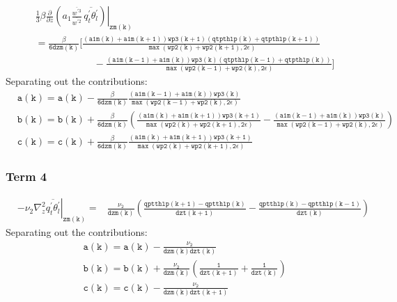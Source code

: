 \documentclass[11pt,fleqn]{article}
\newcommand{\ptlder}[2]{\frac{\partial #1}{\partial #2}}
\begin{document}
\begin{equation}
\begin{split}
& \left.
  \frac{1}{3} \beta
   \ptlder{}{z}
     \left( 
       a_1
       \frac{\overline{w^{'3}}}{\overline{w^{'2}}} \,
       \overline{q_t^{'}\theta_l^{'}}
     \right)
   \right|_{\mathtt{zm(k)}} \\
&= \mathtt{
    \frac{\beta}{6 dzm(k)}
    \bigg[ \frac{\left(a1m(k)+a1m(k+1)\right) wp3(k+1) \left(qtpthlp(k)+qtpthlp(k+1) \right)}
                {\max\left(wp2(k)+wp2(k+1),2\epsilon\right)} } \\
&  \mathtt{ \quad \quad \quad \quad \quad \quad
          -\frac{\left(a1m(k-1)+a1m(k)\right) wp3(k) \left(qtpthlp(k-1)+qtpthlp(k) \right)}
                {\max\left(wp2(k-1)+wp2(k),2\epsilon\right)}
    \bigg]
    }
\end{split}
\end{equation}
%
Separating out the contributions:
%
\begin{equation}
\begin{split}
& \mathtt{ 
   a(k) = a(k) - \frac{\beta}{6 dzm(k)}
                 \frac{\left(a1m(k-1)+a1m(k)\right) wp3(k)}
                      {\max\left(wp2(k-1)+wp2(k),2\epsilon\right)}
  } \\
& \mathtt{
   b(k) = b(k) + \frac{\beta}{6 dzm(k)}
                 \left(
                   \frac{\left(a1m(k)+a1m(k+1)\right) wp3(k+1)}
                        {\max\left(wp2(k)+wp2(k+1),2\epsilon\right)}
                  -\frac{\left(a1m(k-1)+a1m(k)\right) wp3(k)}
                        {\max\left(wp2(k-1)+wp2(k),2\epsilon\right)}
                 \right)
  } \\
& \mathtt{
   c(k) = c(k) + \frac{\beta}{6 dzm(k)}
                 \frac{\left(a1m(k)+a1m(k+1)\right) wp3(k+1)}
                      {\max\left(wp2(k)+wp2(k+1),2\epsilon\right)}
  }
\end{split}
\end{equation}
 
\subsubsection{Term 4}

\begin{equation}
\begin{split}
& \left. - \nu_2 \nabla_z^2 \overline{q_t^{'}\theta_l^{'}} \right|_{\mathtt{zm(k)}}
=& \mathtt{
    \frac{\nu_2}{dzm(k)}
    \left( \frac{qptthlp(k+1)-qptthlp(k)}{dzt(k+1)}
          -\frac{qptthlp(k)-qptthlp(k-1)}{dzt(k)}
    \right)
   }
\end{split}
\end{equation}
%
Separating out the contributions:
%
\begin{equation}
\begin{split}
&\mathtt{a(k) = a(k) - \frac{\nu_2}{dzm(k)dzt(k)} } \\
&\mathtt{b(k) = b(k) + \frac{\nu_2}{dzm(k)}
                       \left( \frac{1}{dzt(k+1)} + \frac{1}{dzt(k)} \right) } \\
&\mathtt{c(k) = c(k) - \frac{\nu_2}{dzm(k)dzt(k+1)} }
\end{split}
\end{equation}
\end{document}
